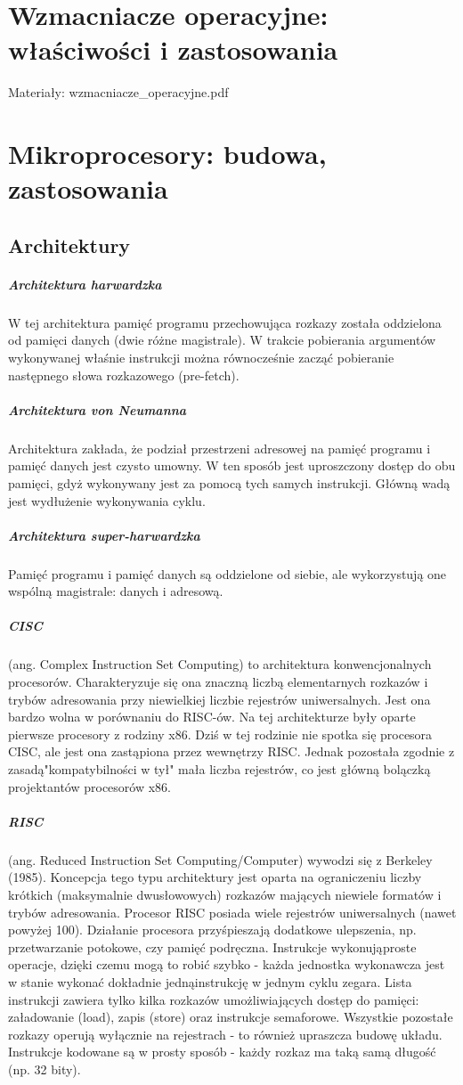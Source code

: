 \documentclass[]{report}
\begin{document}
\section{Wzmacniacze operacyjne: właściwości i zastosowania}
Materiały: wzmacniacze\_operacyjne.pdf
\section{Mikroprocesory: budowa, zastosowania}
\subsection{Architektury}
\subparagraph{Architektura harwardzka}
W tej architektura pamięć programu przechowująca rozkazy została oddzielona od pamięci danych (dwie różne magistrale). W trakcie pobierania argumentów wykonywanej właśnie instrukcji można równocześnie zacząć pobieranie następnego słowa rozkazowego (pre-fetch).

\subparagraph{Architektura von Neumanna}
Architektura zakłada, że podział przestrzeni adresowej na pamięć programu i pamięć danych jest czysto umowny. W ten sposób jest uproszczony dostęp do obu pamięci, gdyż wykonywany jest za pomocą tych samych instrukcji. Główną wadą jest wydłużenie wykonywania cyklu.

\subparagraph{Architektura super-harwardzka}
Pamięć programu i pamięć danych są oddzielone od siebie, ale wykorzystują one wspólną magistrale: danych i adresową.

\subparagraph{CISC} (ang. Complex Instruction Set Computing) to architektura konwencjonalnych procesorów. Charakteryzuje się ona znaczną liczbą elementarnych rozkazów i trybów adresowania przy niewielkiej liczbie rejestrów uniwersalnych. Jest ona bardzo wolna w porównaniu do RISC-ów. Na tej architekturze były oparte pierwsze procesory z rodziny x86. Dziś w tej rodzinie nie spotka się procesora CISC, ale jest ona zastąpiona przez wewnętrzy RISC. Jednak pozostała zgodnie z zasadą"kompatybilności w tył" mała liczba rejestrów, co jest główną bolączką projektantów procesorów x86.

\subparagraph{RISC} (ang. Reduced Instruction Set Computing/Computer) wywodzi się z Berkeley (1985). Koncepcja tego typu architektury jest oparta na ograniczeniu liczby krótkich (maksymalnie dwusłowowych) rozkazów mających niewiele formatów i trybów adresowania. Procesor RISC posiada wiele rejestrów uniwersalnych (nawet powyżej 100). Działanie procesora przyśpieszają dodatkowe ulepszenia, np. przetwarzanie potokowe, czy pamięć podręczna. Instrukcje wykonująproste operacje, dzięki czemu mogą to robić szybko - każda jednostka wykonawcza jest w stanie wykonać dokładnie jednąinstrukcję w jednym cyklu zegara. Lista instrukcji zawiera tylko kilka rozkazów umożliwiających dostęp do pamięci: załadowanie (load), zapis (store) oraz instrukcje semaforowe. Wszystkie pozostałe rozkazy operują wyłącznie na rejestrach - to również upraszcza budowę układu. Instrukcje kodowane są w prosty sposób - każdy rozkaz ma taką samą długość (np. 32 bity).
\end{document}
